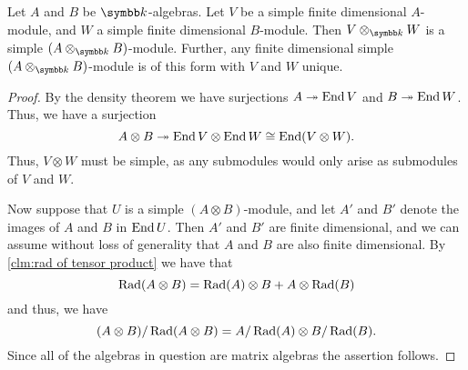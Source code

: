 \begin{thm}{}{}
    Let \(A\) and \(B\) be \(\field\)-algebras.
    Let \(V\) be a simple finite dimensional \(A\)-module, and \(W\) a simple finite dimensional \(B\)-module.
    Then \(V \otimes_{\field} W\) is a simple \((A \otimes_{\field} B)\)-module.
    Further, any finite dimensional simple \((A \otimes_{\field} B)\)-module is of this form with \(V\) and \(W\) unique.
    \begin{proof}
        By the density theorem we have surjections \(A \twoheadrightarrow \operatorname{End} V\) and \(B \twoheadrightarrow \operatorname{End} W\).
        Thus, we have a surjection
        \begin{equation}
            A \otimes B \twoheadrightarrow \operatorname{End} V \otimes \operatorname{End} W \cong \operatorname{End}(V \otimes W).
        \end{equation}
        Thus, \(V \otimes W\) must be simple, as any submodules would only arise as submodules of \(V\) and \(W\).
        
        Now suppose that \(U\) is a simple \((A \otimes B)\)-module, and let \(A'\) and \(B'\) denote the images of \(A\) and \(B\) in \(\operatorname{End} U\).
        Then \(A'\) and \(B'\) are finite dimensional, and we can assume without loss of generality that \(A\) and \(B\) are also finite dimensional.
        By \cref{clm:rad of tensor product} we have that
        \begin{equation}
            \operatorname{Rad}(A \otimes B) = \operatorname{Rad}(A) \otimes B + A \otimes \operatorname{Rad}(B)
        \end{equation}
        and thus, we have
        \begin{equation}
            (A \otimes B)/\operatorname{Rad}(A \otimes B) = A/\operatorname{Rad}(A) \otimes B/\operatorname{Rad}(B).
        \end{equation}
        Since all of the algebras in question are matrix algebras the assertion follows.
    \end{proof}
\end{thm}

